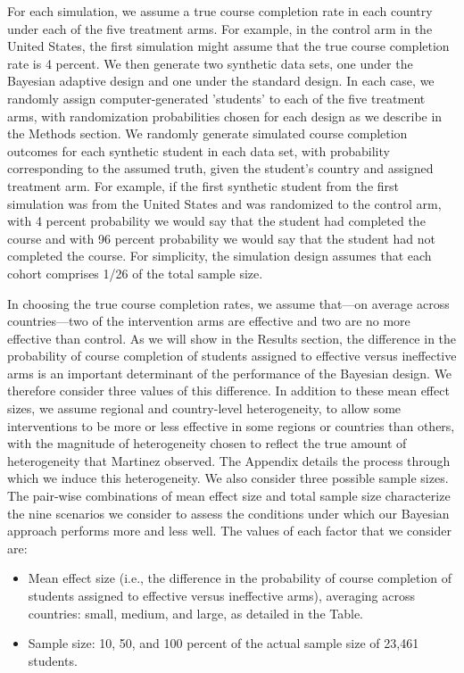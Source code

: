 \documentclass{acm_proc_article-sp}
\begin{document}
For each simulation, we assume a true course completion rate in each country under each of the five treatment arms. For example, in the control arm in the United States, the first simulation might assume that the true course completion rate is 4 percent. We then generate two synthetic data sets, one under the Bayesian adaptive design and one under the standard design. In each case, we randomly assign computer-generated 'students' to each of the five treatment arms, with randomization probabilities chosen for each design as we describe in the Methods section. We randomly generate simulated course completion outcomes for each synthetic student in each data set, with probability corresponding to the assumed truth, given the student's country and assigned treatment arm. For example, if the first synthetic student from the first simulation was from the United States and was randomized to the control arm, with 4 percent probability we would say that the student had completed the course and with 96 percent probability we would say that the student had not completed the course. For simplicity, the simulation design assumes that each cohort comprises 1/26 of the total sample size.

In choosing the true course completion rates, we assume that---on average across countries---two of the intervention arms are effective and two are no more effective than control. As we will show in the Results section, the difference in the probability of course completion of students assigned to effective versus ineffective arms is an important determinant of the performance of the Bayesian design. We therefore consider three values of this difference. In addition to these mean effect sizes, we assume regional and country-level heterogeneity, to allow some interventions to be more or less effective in some regions or countries than others, with the magnitude of heterogeneity chosen to reflect the true amount of heterogeneity that Martinez observed. The Appendix details the process through which we induce this heterogeneity. We also consider three possible sample sizes. The pair-wise combinations of mean effect size and total sample size characterize the nine scenarios we consider to assess the conditions under which our Bayesian approach performs more and less well. The values of each factor that we consider are:
\begin{itemize}
    \item Mean effect size (i.e., the difference in the probability of course completion of students assigned to effective versus ineffective arms), averaging across countries: small, medium, and large, as detailed in the Table. 
    \item Sample size: 10, 50, and 100 percent of the actual sample size of 23,461 students.
\end{itemize}
\end{document}
